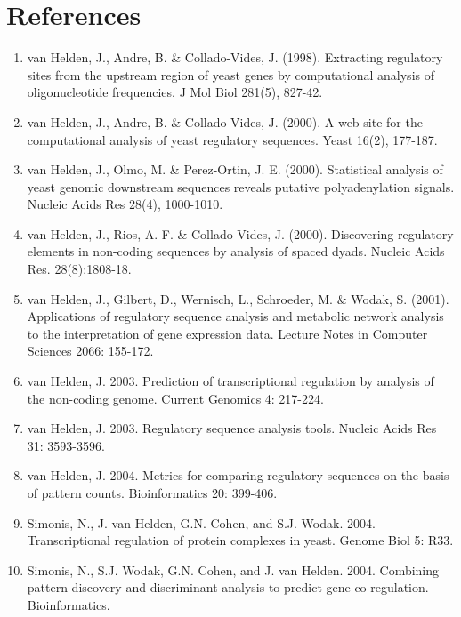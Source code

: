 \chapter{References}

\begin{enumerate}

\item van Helden, J., Andre, B. \& Collado-Vides,
  J. (1998). Extracting regulatory sites from the upstream region of
  yeast genes by computational analysis of oligonucleotide
  frequencies. J Mol Biol 281(5), 827-42.

\item van Helden, J., Andre, B. \& Collado-Vides, J. (2000). A web
  site for the computational analysis of yeast regulatory
  sequences. Yeast 16(2), 177-187.

\item van Helden, J., Olmo, M. \& Perez-Ortin,
  J. E. (2000). Statistical analysis of yeast genomic downstream
  sequences reveals putative polyadenylation signals. Nucleic Acids
  Res 28(4), 1000-1010.

\item van Helden, J., Rios, A. F. \& Collado-Vides,
  J. (2000). Discovering regulatory elements in non-coding sequences
  by analysis of spaced dyads. Nucleic Acids Res. 28(8):1808-18.

\item van Helden, J., Gilbert, D., Wernisch, L., Schroeder, M. \&
  Wodak, S. (2001). Applications of regulatory sequence analysis and
  metabolic network analysis to the interpretation of gene expression
  data. Lecture Notes in Computer Sciences 2066: 155-172.

\item van Helden, J. 2003. Prediction of transcriptional regulation by
  analysis of the non-coding genome. Current Genomics 4: 217-224.

\item van Helden, J. 2003. Regulatory sequence analysis tools. Nucleic
  Acids Res 31: 3593-3596.

\item van Helden, J. 2004. Metrics for comparing regulatory sequences
  on the basis of pattern counts. Bioinformatics 20: 399-406.

\item Simonis, N., J. van Helden, G.N. Cohen, and
  S.J. Wodak. 2004. Transcriptional regulation of protein complexes in
  yeast. Genome Biol 5: R33.

\item Simonis, N., S.J. Wodak, G.N. Cohen, and J. van
  Helden. 2004. Combining pattern discovery and discriminant analysis
  to predict gene co-regulation. Bioinformatics.

\end{enumerate}

